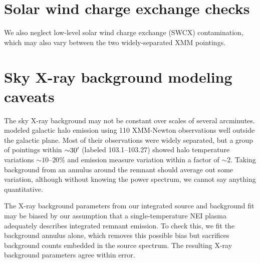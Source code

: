 \documentclass[preprint2,tighten,trackchanges]{aastex6}
\newcommand*{\abt}{\mathord{\sim}} %
\begin{document}




\clearpage  %
\appendix

\setcounter{table}{0}
\renewcommand{\thetable}{A\arabic{table}}
\setcounter{figure}{0}
\renewcommand{\thefigure}{A\arabic{figure}}

\section{Solar wind charge exchange checks}

We also neglect low-level solar wind charge exchange (SWCX) contamination,
which may also vary between the two widely-separated XMM pointings.


\section{Sky X-ray background modeling caveats}

The sky X-ray background may not be constant over scales of several arcminutes.
\citet{henley2013} modeled galactic halo emission using 110 XMM-Newton
observations well outside the galactic plane.
Most of their observations were widely separated, but a group of pointings
within $\abt 30\arcmin$ (labeled 103.1--103.27) showed halo temperature
variations $\abt 10$--$20\%$ and emission measure variation within a factor of
$\abt 2$.
Taking background from an annulus around the remnant should average out some
variation, although without knowing the power spectrum, we cannot say anything
quantitative.

The X-ray background parameters from our integrated source and background fit
may be biased by our assumption that a single-temperature NEI plasma adequately
describes integrated remnant emission.
To check this, we fit the background annulus alone, which removes this possible
bias but sacrifices background counts embedded in the source spectrum.
The resulting X-ray background parameters agree within error.
\end{document}
